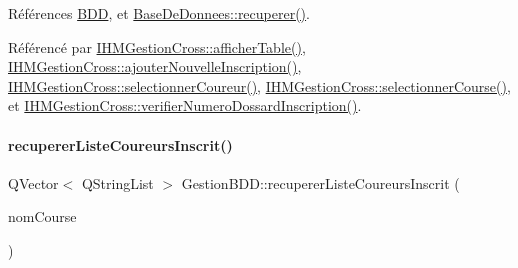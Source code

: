 Références \hyperlink{class_gestion_b_d_d_a1bd17cbf5754eb6e54ae351f1d02dca2}{B\+DD}, et \hyperlink{class_base_de_donnees_a77539baad389f5acf754cd2cd452403e}{Base\+De\+Donnees\+::recuperer()}.



Référencé par \hyperlink{class_i_h_m_gestion_cross_ae1510779a1efa3defecb517467e84f91}{I\+H\+M\+Gestion\+Cross\+::afficher\+Table()}, \hyperlink{class_i_h_m_gestion_cross_af0165d32344af78b4edce59f88c90ff6}{I\+H\+M\+Gestion\+Cross\+::ajouter\+Nouvelle\+Inscription()}, \hyperlink{class_i_h_m_gestion_cross_ad71963d500fd61995fdae94e833db163}{I\+H\+M\+Gestion\+Cross\+::selectionner\+Coureur()}, \hyperlink{class_i_h_m_gestion_cross_ae555b32462455a2cdaf0f8dc2e016d14}{I\+H\+M\+Gestion\+Cross\+::selectionner\+Course()}, et \hyperlink{class_i_h_m_gestion_cross_a164be2d046cf18ee03e3939d03a5580d}{I\+H\+M\+Gestion\+Cross\+::verifier\+Numero\+Dossard\+Inscription()}.


\mbox{\label{class_gestion_b_d_d_a09b547cb065256acd269c64e273c93fd}} 
\paragraph{\texorpdfstring{recuperer\+Liste\+Coureurs\+Inscrit()}{recupererListeCoureursInscrit()}}
{\footnotesize\ttfamily Q\+Vector$<$ Q\+String\+List $>$ Gestion\+B\+D\+D\+::recuperer\+Liste\+Coureurs\+Inscrit (\begin{DoxyParamCaption}\item[{Q\+String}]{nom\+Course }\end{DoxyParamCaption})}



